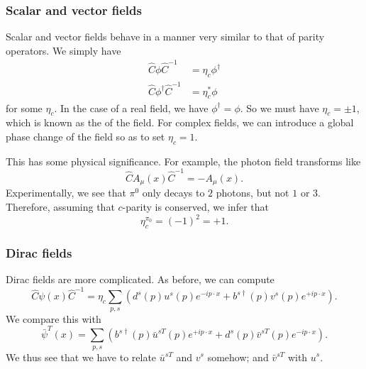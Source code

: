 \documentclass[a4paper]{article}
\begin{document}
\subsubsection*{Scalar and vector fields}
Scalar and vector fields behave in a manner very similar to that of parity operators. We simply have
\begin{align*}
  \hat{C} \phi \hat{C}^{-1} &= \eta_c \phi^\dagger\\
  \hat{C} \phi^\dagger \hat{C}^{-1} &= \eta_c^* \phi
\end{align*}
for some $\eta_c$. In the case of a real field, we have $\phi^\dagger = \phi$. So we must have $\eta_c = \pm 1$, which is known as the  of the field. For complex fields, we can introduce a global phase change of the field so as to set $\eta_c = 1$.

This has some physical significance. For example, the photon field transforms like
\[
  \hat{C}A_\mu(x) \hat{C}^{-1} = - A_\mu(x).
\]
Experimentally, we see that $\pi^0$ only decays to $2$ photons, but not $1$ or $3$. Therefore, assuming that $c$-parity is conserved, we infer that
\[
  \eta_c^{\pi_0} = (-1)^2 = +1.
\]

\subsubsection*{Dirac fields}
Dirac fields are more complicated. As before, we can compute
\[
  \hat{C} \psi(x) \hat{C}^{-1} = \eta_c \sum_{p, s}\left(d^s(p) u^s(p)e^{-ip\cdot x} + b^{s\dagger} (p) v^s(p) e^{+ip\cdot x}\right).
\]
We compare this with
\[
  \bar\psi^T(x) = \sum_{p, s} \left( b^{s\dagger}(p) \bar{u}^{sT}(p) e^{+ip\cdot x} + d^s (p) \bar{v}^{sT}(p) e^{-ip\cdot x}\right).
\]
We thus see that we have to relate $\bar{u}^{sT}$ and $v^s$ somehow; and $\bar{v}^{sT}$ with $u^s$.
\end{document}
